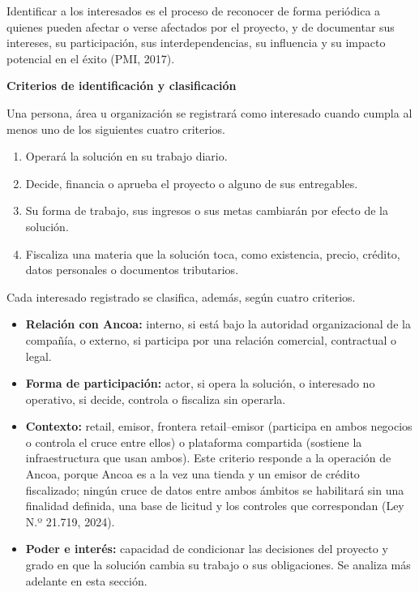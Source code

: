 \documentclass[11pt]{article}
\begin{document}
Identificar a los interesados es el proceso de reconocer de forma periódica a quienes pueden afectar o verse afectados por el proyecto, y de documentar sus intereses, su participación, sus interdependencias, su influencia y su impacto potencial en el éxito (PMI, 2017).

\textbf{Criterios de identificación y clasificación}

Una persona, área u organización se registrará como interesado cuando
cumpla al menos uno de los siguientes cuatro criterios.

\begin{enumerate}
\def\labelenumi{\arabic{enumi}.}
\item
  Operará la solución en su trabajo diario.
\item
  Decide, financia o aprueba el proyecto o alguno de sus entregables.
\item
  Su forma de trabajo, sus ingresos o sus metas cambiarán por efecto de
  la solución.
\item
  Fiscaliza una materia que la solución toca, como existencia, precio,
  crédito, datos personales o documentos tributarios.
\end{enumerate}

Cada interesado registrado se clasifica, además, según cuatro criterios.

\begin{itemize}
\item
  \textbf{Relación con Ancoa:} interno, si está bajo la autoridad
  organizacional de la compañía, o externo, si participa por una
  relación comercial, contractual o legal.
\item
  \textbf{Forma de participación:} actor, si opera la solución, o
  interesado no operativo, si decide, controla o fiscaliza sin operarla.
\item
  \textbf{Contexto:} retail, emisor, frontera retail--emisor (participa
  en ambos negocios o controla el cruce entre ellos) o plataforma
  compartida (sostiene la infraestructura que usan ambos). Este criterio
  responde a la operación de Ancoa, porque Ancoa es a la vez una tienda
  y un emisor de crédito fiscalizado; ningún cruce de datos entre ambos
  ámbitos se habilitará sin una finalidad definida, una base de licitud
  y los controles que correspondan (Ley N.º 21.719, 2024).
\item
  \textbf{Poder e interés:} capacidad de condicionar las decisiones del
  proyecto y grado en que la solución cambia su trabajo o sus
  obligaciones. Se analiza más adelante en esta sección.
\end{itemize}
\end{document}
